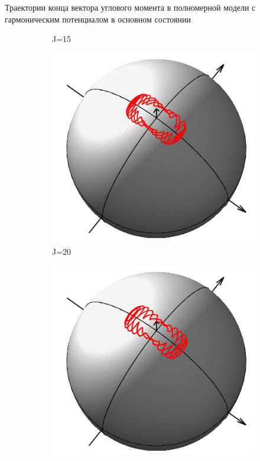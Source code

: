 \documentclass[hyperref={pdfpagelabels=false},usepdftitle=false, xcolor = dvipsnames]{beamer}
\begin{document}
\begin{frame}{\small Траектории конца вектора углового момента в полномерной модели с гармоническим потенциалом в основном состоянии}
\begin{block}{}
\begin{figure}
\begin{subfigure}{0.25\textwidth}
	    \caption{J=15}
	  \end{subfigure}
	  \begin{subfigure}{0.25\textwidth}
	    \includegraphics[width = \linewidth]{../pictures/HarmGroundState00/plot_J=20.png}
	    \caption{J=20}
	  \end{subfigure}
	  \begin{subfigure}{0.25\textwidth}
	    \includegraphics[width = \linewidth]{../pictures/HarmGroundState00/plot_J=22.png}

\end{subfigure}
\end{figure}
\end{block}
\end{frame}
\end{document}
